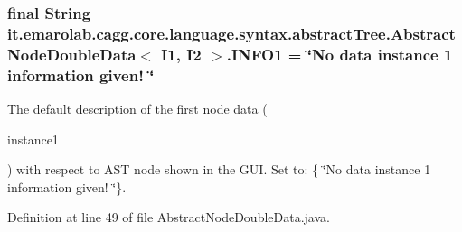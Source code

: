 \hypertarget{classit_1_1emarolab_1_1cagg_1_1core_1_1language_1_1syntax_1_1abstractTree_1_1AbstractNodeDoubleData_3_01I1_00_01I2_01_4_a0fc31565ff89bbacb069154c7d67e2a0}{
\subsubsection[{I\-N\-F\-O1}]{\setlength{\rightskip}{0pt plus 5cm}final String it.\-emarolab.\-cagg.\-core.\-language.\-syntax.\-abstract\-Tree.\-Abstract\-Node\-Double\-Data$<$ I1, I2 $>$.I\-N\-F\-O1 = \char`\"{}No data instance 1 information given! \char`\"{}\hspace{0.3cm}{\ttfamily [static]}}}\label{classit_1_1emarolab_1_1cagg_1_1core_1_1language_1_1syntax_1_1abstractTree_1_1AbstractNodeDoubleData_3_01I1_00_01I2_01_4_a0fc31565ff89bbacb069154c7d67e2a0}
The default description of the first node data (
\begin{DoxyCode}
instance1 
\end{DoxyCode}
 ) with respect to A\-S\-T node shown in the G\-U\-I. Set to\-: \{ \char`\"{}\-No data instance 1 information given! \char`\"{}\}. 

Definition at line 49 of file Abstract\-Node\-Double\-Data.\-java.

